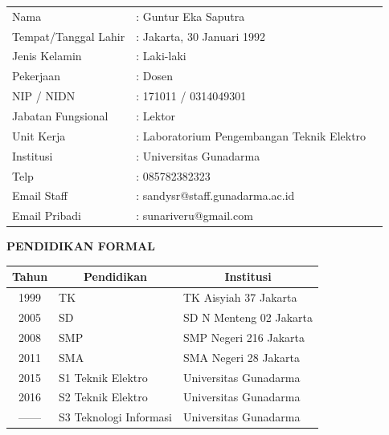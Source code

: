\begin{table}[H]
	\label{tab:my-table}
	\begin{tabular}{lll}
		Nama & : Guntur Eka Saputra \\
		Tempat/Tanggal Lahir & : Jakarta, 30 Januari 1992  \\
		Jenis Kelamin & : Laki-laki \\
		Pekerjaan & : Dosen \\
		NIP / NIDN & : 171011 / 0314049301 \\
		Jabatan Fungsional & : Lektor \\
		Unit Kerja & : Laboratorium Pengembangan Teknik Elektro \\
		Institusi & : Universitas Gunadarma \\
		Telp & : 085782382323 \\
		Email Staff & : sandy\textunderscore sr@staff.gunadarma.ac.id \\
		Email  Pribadi& : sunariveru@gmail.com \\
 
	\end{tabular}
\end{table}


\vspace{8cm}
\noindent \textbf{PENDIDIKAN FORMAL}
\vspace{0.2cm}

\begin{table}[H]
		\centering
	\label{tab:my-table}
	\begin{longtable}{|c|l|p{7.5cm}|}
		\hline
		\textbf{Tahun} & \multicolumn{1}{c|}{\textbf{Pendidikan}} & \multicolumn{1}{c|}{\textbf{Institusi}} \\ \hline
		1999 & TK & TK Aisyiah 37 Jakarta \\ \hline
		2005 & SD & SD N Menteng 02 Jakarta\\ \hline
		2008 & SMP & SMP Negeri 216 Jakarta \\ \hline
		2011 & SMA & SMA Negeri 28 Jakarta \\ \hline
		2015 & S1   Teknik Elektro & Universitas Gunadarma         \\ \hline
		2016 & S2  Teknik Elektro & Universitas Gunadarma  \\ \hline
		------ & S3   Teknologi Informasi & Universitas Gunadarma \\ \hline
	\end{longtable}%
		\centering	
\end{table}

